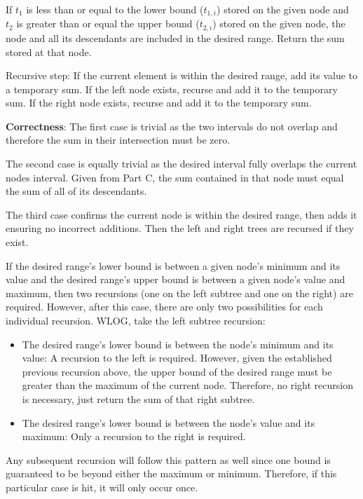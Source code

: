 \documentclass[12pt,twoside]{article}
\begin{document}
\begin{problems}
\begin{problemparts}
    If $ t_1 $ is less than or equal to the lower bound ($t_{1,i}$) stored on
    the given node and $ t_2 $ is greater than or equal the upper bound
    ($t_{2,i}$) stored on the given node, the node and all its descendants
    are included in the desired range. Return the sum stored at that node.

    Recursive step: If the current element is within the desired range, add
    its value to a temporary sum. If the left node exists, recurse and add it
    to the temporary sum. If the right node exists, recurse and add it to the
    temporary sum.

    \smallbreak

    {\bf Correctness}: The first case is trivial as the two intervals do not
    overlap and therefore the sum in their intersection must be zero.

    The second case is equally trivial as the desired interval fully overlaps
    the current nodes interval. Given from Part C, the sum contained in that
    node must equal the sum of all of its descendants.

    The third case confirms the current node is within the desired range, then
    adds it ensuring no incorrect additions. Then the left and right trees are
    recursed if they exist.

\problempart If the desired range's lower bound is between a given node's
    minimum and its value and the desired range's upper bound is between a
    given node's value and maximum, then two recursions (one on the left 
    subtree and one on the right) are required. However, after this case,
    there are only two possibilities for each individual recursion. WLOG,
    take the left subtree recursion:
    \begin{itemize}
        \item The desired range's lower bound is between the node's minimum
        and its value: A recursion to the left is required. However, given
        the established previous recursion above, the upper bound of the
        desired range must be greater than the maximum of the current node.
        Therefore, no right recursion is necessary, just return the sum of
        that right subtree.
        \item The desired range's lower bound is between the node's value and
        its maximum: Only a recursion to the right is required.
    \end{itemize}
    Any subsequent recursion will follow this pattern as well since one bound
    is guaranteed to be beyond either the maximum or minimum. Therefore, if
    this particular case is hit, it will only occur once.


\end{problemparts}
\end{problems}
\end{document}
